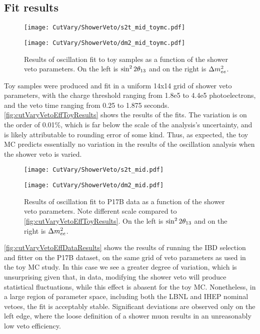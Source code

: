 \documentclass[../thesis.tex]{subfiles}
\begin{document}
\subsection{Fit results}%
\label{sec:cutVaryMuVetoDataResults}

\begin{figure}[ht]
  \begin{minipage}{0.5\linewidth}%
    \texttt{[image: CutVary/ShowerVeto/s2t\_mid\_toymc.pdf]}%
  \end{minipage}%
  \begin{minipage}{0.5\linewidth}%
    \texttt{[image: CutVary/ShowerVeto/dm2\_mid\_toymc.pdf]}%
  \end{minipage}%
  \caption{Results of oscillation fit to toy samples as a function of the shower veto parameters. On the left is $\sin^2 2\theta_{13}$ and on the right is $\Delta m^2_{ee}$.}
  \label{fig:cutVaryVetoEffToyResults}
\end{figure}

Toy samples were produced and fit in a uniform 14x14 grid of shower veto parameters, with the charge threshold ranging from 1.8e5 to 4.4e5 photoelectrons, and the veto time ranging from 0.25 to 1.875 seconds. \autoref{fig:cutVaryVetoEffToyResults} shows the results of the fits. The variation is on the order of 0.01\%, which is far below the scale of the analysis's uncertainty, and is likely attributable to rounding error of some kind. Thus, as expected, the toy MC predicts essentially no variation in the results of the oscillation analysis when the shower veto is varied.

\begin{figure}[ht]
  \begin{minipage}{0.5\linewidth}%
    \texttt{[image: CutVary/ShowerVeto/s2t\_mid.pdf]}%
  \end{minipage}%
  \begin{minipage}{0.5\linewidth}%
    \texttt{[image: CutVary/ShowerVeto/dm2\_mid.pdf]}%
  \end{minipage}%
  \caption{Results of oscillation fit to P17B data as a function of the shower veto parameters. Note different scale compared to \autoref{fig:cutVaryVetoEffToyResults}. On the left is $\sin^2 2\theta_{13}$ and on the right is $\Delta m^2_{ee}$.}
  \label{fig:cutVaryVetoEffDataResults}
\end{figure}

\autoref{fig:cutVaryVetoEffDataResults} shows the results of running the IBD selection and fitter on the P17B dataset, on the same grid of veto parameters as used in the toy MC study. In this case we see a greater degree of variation, which is unsurprising given that, in data, modifying the shower veto will produce statistical fluctuations, while this effect is abasent for the toy MC. Nonetheless, in a large region of parameter space, including both the LBNL and IHEP nominal vetoes, the fit is acceptably stable. Significant deviations are observed only on the left edge, where the loose definition of a shower muon results in an unreasonably low veto efficiency.
\end{document}
